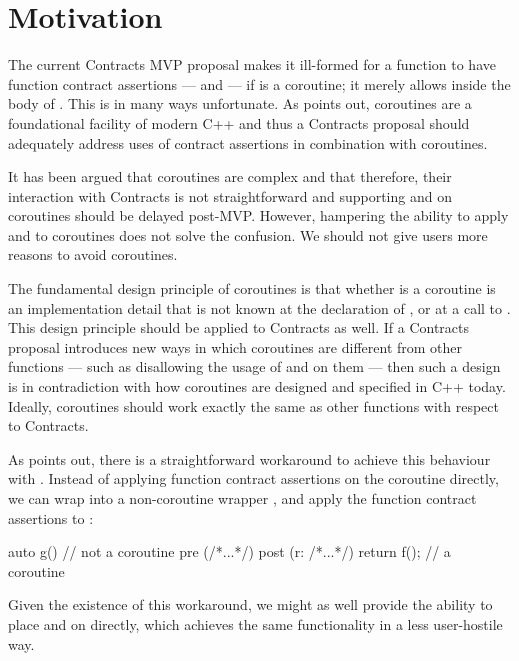 

\section{Motivation}
\label{intro}

The current Contracts MVP proposal \cite{P2900R8} makes it ill-formed for a function  to have function contract assertions ---  and  --- if  is a coroutine; it merely allows  inside the body of . This is in many ways unfortunate. As \cite{P3173R0} points out, coroutines are a foundational facility of modern C++ and thus a Contracts proposal should adequately address uses of contract assertions in combination with coroutines.

It has been argued that coroutines are complex and that therefore, their interaction with Contracts is not straightforward and supporting  and  on coroutines should be delayed post-MVP. However, hampering the ability to apply  and  to coroutines does not solve the confusion. We should not give users more reasons to avoid coroutines.

The fundamental design principle of coroutines is that whether  is a coroutine is an implementation detail that is not known at the declaration of , or at a call to . This design principle should be applied to Contracts as well. If a Contracts proposal introduces new ways in which coroutines are different from other functions --- such as disallowing the usage of  and  on them --- then such a design is in contradiction with how coroutines are designed and specified in C++ today. Ideally, coroutines should work exactly the same as other functions with respect to Contracts.

As \cite{P3251R0} points out, there is a straightforward workaround to achieve this behaviour with \cite{P2900R8}. Instead of applying function contract assertions on the coroutine  directly, we can wrap  into a non-coroutine wrapper , and apply the function contract assertions to :
\begin{codeblock}
auto g()  // not a coroutine
pre (/*...*/) 
post (r: /*...*/) { 
  return f();  // a coroutine
} 
\end{codeblock}
Given the existence of this workaround, we might as well provide the ability to place  and  on  directly, which achieves the same functionality in a less user-hostile way.

